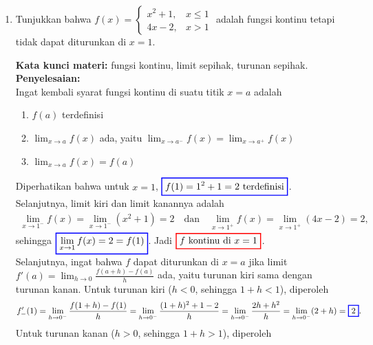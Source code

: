\documentclass[10pt,openany,a4paper]{article}
\theoremstyle{definition}
\theoremstyle{definition}
\theoremstyle{plain}
\newenvironment{jawab}[2][tes]{%
\par\noindent\textbf{Kata kunci materi:} #1.\\
\textbf{Penyelesaian:} #2%
}{}
\begin{document}
\begin{enumerate}
    \item Tunjukkan bahwa $f(x)=\begin{cases}
        x^2+1, & x\leq 1\\
        4x-2, & x>1
    \end{cases}$ adalah fungsi kontinu tetapi tidak dapat diturunkan di $x=1$.
    \begin{jawab}[fungsi kontinu, limit sepihak, turunan sepihak]{~\\
        Ingat kembali syarat fungsi kontinu di suatu titik \(x = a\) adalah
        \begin{enumerate}
            \item \(f(a)\) terdefinisi
            \item \(\displaystyle \lim_{x \to a} f(x)\) ada, yaitu $\displaystyle \lim_{x \to a^-} f(x) = \lim_{x \to a^+} f(x)$
            \item \(\displaystyle\lim_{x \to a} f(x) = f(a)\)
        \end{enumerate}
        Diperhatikan bahwa untuk $x=1$, $\colorlet{oldcolor}{.}
        \color{blue}
        \setlength{\fboxrule}{1pt} \boxed{\color{oldcolor}f(1) = 1^2+1 = 2~\text{terdefinisi}}\color{oldcolor}$. Selanjutnya, limit kiri dan limit kanannya adalah
        \begin{align*}
            \lim_{x\to 1^-} f(x) = \lim_{x\to 1^-} (x^2+1) = 2 \quad\text{dan}\quad \lim_{x\to 1^+} f(x) = \lim_{x\to 1^+} (4x-2) = 2,
        \end{align*}
        sehingga $\colorlet{oldcolor}{.}
        \color{blue}
        \setlength{\fboxrule}{1pt} \boxed{\color{oldcolor}\lim_{x\to 1} f(x) = 2 = f(1)}\color{oldcolor}$. Jadi $\colorlet{oldcolor}{.}
        \color{red}
        \setlength{\fboxrule}{1pt} \boxed{\color{oldcolor}f \text{ kontinu di } x=1}\color{oldcolor}$.\\
        Selanjutnya, ingat bahwa $f$ dapat diturunkan di $x=a$ jika limit $\displaystyle f'(a)=\lim_{h\to 0}\frac{f(a+h)-f(a)}{h}$ ada, yaitu turunan kiri sama dengan turunan kanan. Untuk turunan kiri ($h<0$, sehingga $1+h<1$), diperoleh
        \begin{align*}
            f'_-(1) = \lim_{h\to 0^-}\frac{f(1+h)-f(1)}{h} = \lim_{h\to 0^-}\frac{(1+h)^2+1-2}{h} = \lim_{h\to 0^-}\frac{2h+h^2}{h} = \lim_{h\to 0^-}(2+h) = \colorlet{oldcolor}{.}
        \color{blue}
        \setlength{\fboxrule}{1pt} \boxed{\color{oldcolor}2}\color{oldcolor}.
        \end{align*}
        Untuk turunan kanan ($h>0$, sehingga $1+h>1$), diperoleh
}
\end{jawab}
\end{enumerate}
\end{document}

